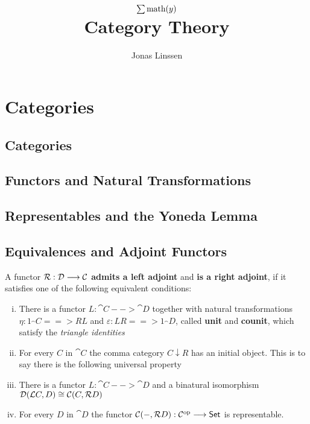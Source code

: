 

\title{$\sum\text{math}(y)$\\Category Theory}
\author{Jonas Linssen}


	\maketitle
	\tableofcontents

	\newpage
	\section{Categories}
	\subsection{Categories}
	\subsection{Functors and Natural Transformations}
	\subsection{Representables and the Yoneda Lemma}
	\subsection{Equivalences and Adjoint Functors}

	\begin{definition}
		A functor $\mathcal{R}:\mathcal{D} --> \mathcal{C}$ \textbf{admits a left adjoint} and \textbf{is a right adjoint}, if it satisfies one of the following equivalent conditions:
		\begin{enumerate}[(i)]
			\item{
				There is a functor $L:\cat{C} --> \cat{D}$ together with natural transformations $\eta: 1_\cat{C} ==> RL$ and $\varepsilon: LR ==> 1_\cat{D}$, called \textbf{unit} and \textbf{counit}, which satisfy the \textit{triangle identities} 
			}
			\item{
				For every $C$ in $\cat{C}$ the comma category $C \downarrow R$ has an initial object. This is to say there is the following universal property 
			}
			\item{
				There is a functor $L:\cat{C} --> \cat{D}$ and a binatural isomorphism $\mathcal{D}(\mathcal{L}C,D) \cong \mathcal{C}(C,\mathcal{R}D)$
			}
			\item{
				For every $D$ in $\cat{D}$ the functor $\mathcal{C}(-,\mathcal{R}D):\mathcal{C}^{\text{op}} --> \textsf{Set}$ is representable.
			}
		\end{enumerate} 
	\end{definition}

